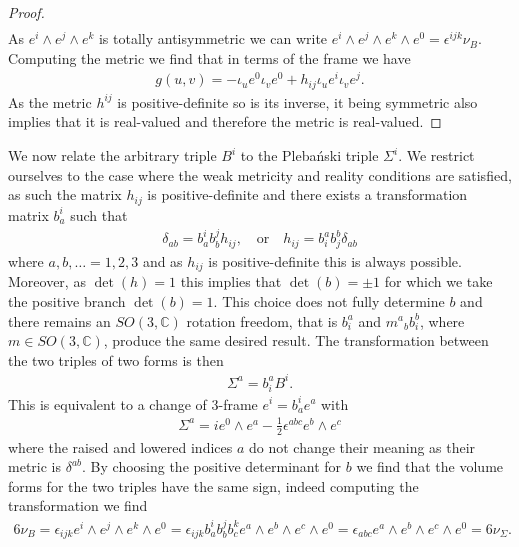 \documentclass[10pt]{report}
\newcommand{\pleb}[0]{Pleba\'nski}
\theoremstyle{definition}
\newcommand{\C}[0]{\mathbb{C}}
\begin{document}
\begin{proof}
\begin{align}
    \end{align}
    As $e^i \wedge e^j \wedge e^k$ is totally antisymmetric we can write $e^i \wedge e^j \wedge e^k \wedge e^0 = \epsilon^{ijk} \nu_B$. Computing the metric we find that in terms of the frame we have
    \begin{align}\label{eq:pleb-spacetime-metric-from-frame-and-h}
        g(u,v) = - \iota_u e^0 \iota_v e^0 + h_{ij} \iota_u e^i \iota_v e^j.
    \end{align}
    As the metric $h^{ij}$ is positive-definite so is its inverse, it being symmetric also implies that it is real-valued and therefore the metric is real-valued.
    
\end{proof} 

We now relate the arbitrary triple $B^i$ to the \pleb{} triple $\Sigma^i$. We restrict ourselves to the case where the weak metricity and reality conditions are satisfied, as such the matrix $h_{ij}$ is positive-definite and there exists a transformation matrix $b_a^i$ such that
\begin{align}
    \delta_{ab} = b_a^i b_b^j h_{ij}, \quad \textrm{or} \quad h_{ij} = b_i^a b_j^b \delta_{ab}
\end{align}
where $a,b,\ldots = 1,2,3$ and as $h_{ij}$ is positive-definite this is always possible. Moreover, as $\det(h) = 1$ this implies that $\det(b) = \pm 1$ for which we take the positive branch $\det(b) = 1$. This choice does not fully determine $b$ and there remains an $SO(3,\C)$ rotation freedom, that is $b^a_i$ and $m^a{}_b b^b_i$, where $m \in SO(3,\C)$, produce the same desired result. The transformation between the two triples of two forms is then
\begin{align}
    \Sigma^a = b^a_i B^i.
\end{align}
This is equivalent to a change of 3-frame $e^i = b^i_a e^a$ with 
\begin{align}
    \Sigma^a = i e^0 \wedge e^a - \frac{1}{2} \epsilon^{a b c} e^b \wedge e^c
\end{align}
where the raised and lowered indices $a$ do not change their meaning as their metric is $\delta^{ab}$. By choosing the positive determinant for $b$ we find that the volume forms for the two triples have the same sign, indeed computing the transformation we find 
\begin{align}
    6\nu_B = \epsilon_{ijk} e^i \wedge e^j \wedge e^k \wedge e^0 = \epsilon_{ijk} b^i_a b^j_b b^k_c e^a \wedge e^b \wedge e^c \wedge e^0 = \epsilon_{abc} e^a \wedge e^b \wedge e^c \wedge e^0 = 6\nu_\Sigma.
\end{align}
\end{document}
